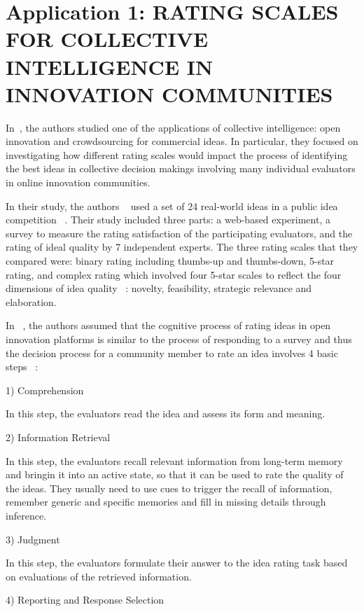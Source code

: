 \section{Application 1: RATING SCALES FOR COLLECTIVE INTELLIGENCE IN
INNOVATION COMMUNITIES}

In~\cite{ratings}, the authors studied one of the applications of collective intelligence: open innovation and crowdsourcing for commercial ideas. In particular, they focused on investigating how different rating scales would impact the process of identifying the best ideas in collective decision makings involving many individual evaluators in online innovation communities. 

In their study, the authors ~\cite{ratings} used a set of 24 real-world ideas in a public idea competition ~\cite{blohm2011does}. Their study included three parts: a web-based experiment, a survey to measure the rating satisfaction of the participating evaluators, and the rating of ideal quality by 7 independent experts. The three rating scales that they compared were: binary rating including thumbs-up and thumbs-down, 5-star rating, and complex rating which involved four 5-star scales to reflect the four dimensions of idea quality ~\cite{blohm2011does}: novelty, feasibility, strategic relevance and elaboration. 

In ~\cite{ratings}, the authors assumed that the cognitive process of rating ideas in open innovation platforms is similar to the process of responding to a survey and thus the decision process for a community member to rate an idea involves 4 basic steps ~\cite{tourangeau2000psychology}: 

1) Comprehension

In this step, the evaluators read the idea and assess its form and meaning.

2) Information Retrieval

In this step, the evaluators recall relevant information from long-term memory and bringin it into an active state, so that it can be used to rate the quality of the ideas. They usually need to use cues to trigger the recall of information, remember generic and specific
memories and fill in missing details through inference.

3) Judgment

In this step, the evaluators formulate their answer to the idea rating task based on evaluations of the retrieved information.

4) Reporting and Response Selection

